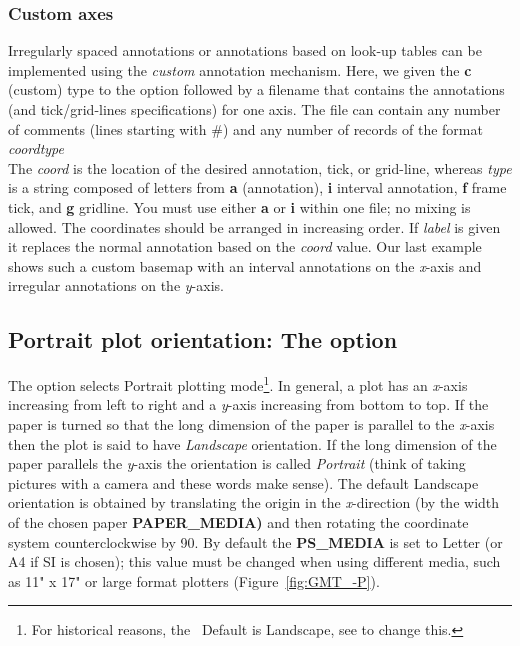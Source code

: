 \subsubsection{Custom axes}
\label{sec:custaxes}
Irregularly spaced annotations or annotations based on look-up tables can be implemented using
the \emph{custom} annotation mechanism.  Here, we given the \textbf{c} (custom) type to the 
option followed by a filename that contains the annotations (and tick/grid-lines specifications) for one axis.
The file can contain any number of comments (lines starting with \#) and any number of records of
the format
\\
\emph{coord}\quad	\emph{type}
\\
The \emph{coord} is the location of the desired annotation, tick, or grid-line, whereas
\emph{type} is a string composed of letters from \textbf{a} (annotation), \textbf{i} interval
annotation, \textbf{f} frame tick, and \textbf{g} gridline.  You must use either \textbf{a} or \textbf{i}
within one file; no mixing is allowed.  The coordinates should be arranged in increasing order.
If \emph{label} is given it replaces the normal
annotation based on the \emph{coord} value.  Our last example shows such a custom basemap
with an interval annotations on the \emph{x}-axis and irregular annotations on the \emph{y}-axis.



\subsection{Portrait plot orientation: The  option}


The  option selects Portrait plotting mode\footnote{For historical reasons, the \GMT\
Default is Landscape, see  to change this.}.  In general,
a plot has an \emph{x}-axis increasing from left to
right and a \emph{y}-axis increasing from bottom to top.  If the
paper is turned so that the long dimension of the paper is
parallel to the \emph{x}-axis then the plot is said to have
\emph{Landscape} orientation.  If the long dimension of
the paper parallels the \emph{y}-axis the orientation is called
\emph{Portrait} (think of taking pictures with a camera
and these words make sense).  The
default Landscape orientation is obtained by translating the origin in the
\emph{x}-direction (by the width of the chosen paper \textbf{PAPER\_MEDIA)} and then rotating the
coordinate system counterclockwise by 90\DS.  By default the \textbf{PS\_MEDIA} is
set to Letter (or A4 if SI is chosen); this value must be changed
when using different media, such as 11" x 17" or large format plotters
(Figure~\ref{fig:GMT_-P}).


